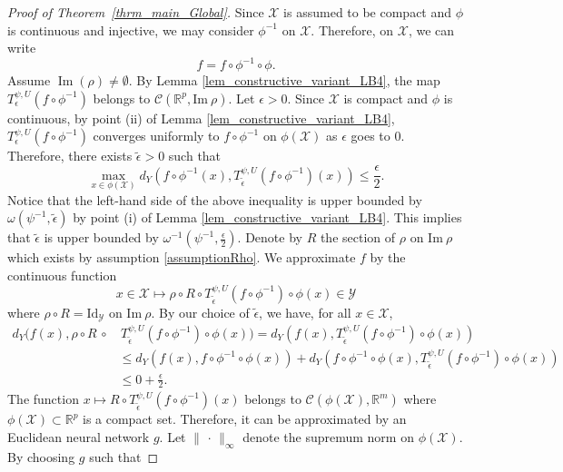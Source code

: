 \documentclass[anon,12pt]{colt2021} %
\newcommand{\xxx}{\mathcal{X}}
\newcommand{\yyy}{\mathcal{Y}}
\begin{document}
\begin{proof}[{Proof of Theorem~\ref{thrm_main_Global}}]
Since $\xxx$ is assumed to be compact and $\phi$ is continuous and injective, we may consider $\phi^{-1}$ on $\xxx$. Therefore, on $\xxx$, we can write
\begin{equation*}
    f = f \circ \phi^{-1} \circ \phi.
\end{equation*}
Assume $\operatorname{Im}(\rho)\neq \emptyset$.  
By Lemma \ref{lem_constructive_variant_LB4}, the map $T_{\epsilon}^{\psi, U} (f \circ \phi^{-1})$ belongs to $\mathcal{C}(\mathbb{R}^{p}, \text{Im} \ \rho)$. Let $\epsilon > 0$. Since $\xxx$ is compact and $\phi$ is continuous, by point (ii) of Lemma \ref{lem_constructive_variant_LB4}, $T_{\epsilon}^{\psi, U} (f \circ \phi^{-1})$ converges uniformly to $f \circ \phi^{-1}$ on $\phi(\xxx)$ as $\epsilon$ goes to $0$. Therefore, there exists $\tilde \epsilon > 0$ such that
\begin{equation*}
    \max_{x \in \phi(\xxx)} d_{Y}(f \circ \phi^{-1}(x), T_{\tilde \epsilon}^{\psi, U} (f \circ \phi^{-1} )(x)) \leq \frac{\epsilon}{2}.
\end{equation*}
Notice that the left-hand side of the above inequality is upper bounded by $\omega(\psi^{-1}, \tilde \epsilon)$ by point (i) of Lemma \ref{lem_constructive_variant_LB4}. This implies that $\tilde \epsilon$ is upper bounded by $\omega^{-1}(\psi^{-1}, \frac{\epsilon}{2})$. Denote by $R$ the section of $\rho$ on $\text{Im} \ \rho$ which exists by assumption \ref{assumptionRho}. We approximate $f$ by the continuous function
\begin{equation*}
    x \in \xxx \mapsto \rho \circ R \circ T_{\tilde \epsilon}^{\psi, U} (f \circ \phi^{-1}) \circ \phi (x) \in \yyy
\end{equation*}
where $\rho \circ R = \text{Id}_{\yyy}$ on $\text{Im} \ \rho$. By our choice of $\tilde \epsilon$, we have, for all $x \in \xxx$,
\begin{align*}
    d_{Y}(f(x), \rho \circ R \, \circ & \, T_{\tilde \epsilon}^{\psi, U} (f \circ \phi^{-1}) \circ \phi (x) ) = d_{Y}(f(x), T_{\tilde \epsilon}^{\psi, U} (f \circ \phi^{-1}) \circ \phi (x)) \\
    & \leq d_{Y}(f(x), f \circ \phi^{-1} \circ \phi (x)) + d_{Y}(f \circ \phi^{-1} \circ \phi (x), T_{\tilde \epsilon}^{\psi, U} (f \circ \phi^{-1}) \circ \phi (x)) \\
    & \leq 0 + \frac{\epsilon}{2}.
\end{align*}
The function $x \mapsto R \circ T_{\tilde \epsilon}^{\psi, U} (f \circ \phi^{-1})(x)$ belongs to $\mathcal{C}(\phi(\xxx), \mathbb{R}^{m})$ where $\phi(\xxx) \subset \mathbb{R}^{p}$ is a compact set. Therefore, it can be approximated by an Euclidean neural network $g$. Let $\| \, \cdot \, \|_{\infty}$ denote the supremum norm on $\phi(\xxx)$. By choosing $g$ such that 

\end{proof}
\end{document}
